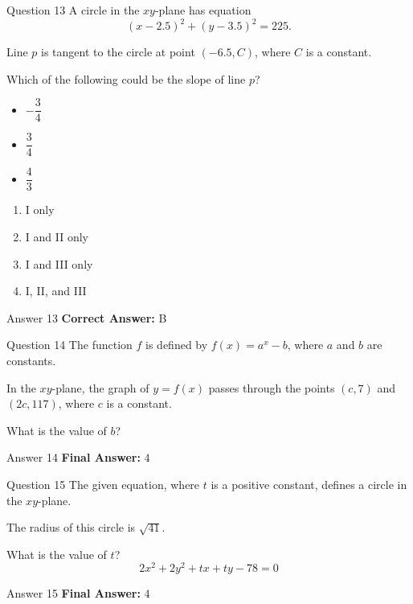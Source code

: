 \documentclass{beamer}
\begin{document}
\begin{frame}{Question 13}
\small
A circle in the \(xy\)-plane has equation
\[
(x - 2.5)^2 + (y - 3.5)^2 = 225.
\]

Line \(p\) is tangent to the circle at point \((-6.5, C)\), where \(C\) is a constant.

Which of the following could be the slope of line \(p\)?

\begin{itemize}
\item[I] \(-\dfrac{3}{4}\)
\item[II] \(\dfrac{3}{4}\)
\item[III] \(\dfrac{4}{3}\)
\end{itemize}
\vspace{0.35cm}
\begin{enumerate}
    \item[A.] I only
    \item[B.] I and II only
    \item[C.] I and III only
    \item[D.] I, II, and III
\end{enumerate}
\end{frame}
\begin{frame}{Answer 13}
\small
\textbf{Correct Answer:} B
\end{frame}

\begin{frame}{Question 14}
\small
The function \(f\) is defined by \(f(x) = a^x - b\), where \(a\) and \(b\) are constants.

In the \(xy\)-plane, the graph of \(y = f(x)\) passes through the points \((c, 7)\) and \((2c, 117)\), where \(c\) is a constant.

What is the value of \(b\)?
\end{frame}
\begin{frame}{Answer 14}
\small
\textbf{Final Answer:} $\boxed{4}$
\end{frame}

\begin{frame}{Question 15}
\small
The given equation, where \(t\) is a positive constant, defines a circle in the \(xy\)-plane.

The radius of this circle is \(\sqrt{41}\).

What is the value of \(t\)?
\[
2x^2 + 2y^2 + tx + ty - 78 = 0
\]
\end{frame}
\begin{frame}{Answer 15}
\small
\textbf{Final Answer:} $\boxed{4}$
\end{frame}
\end{document}
